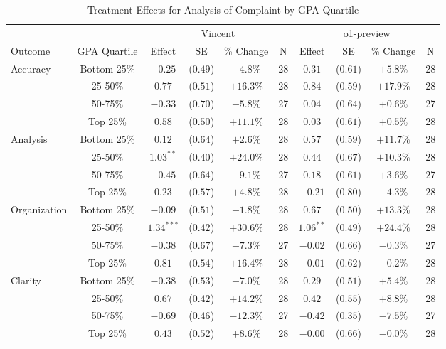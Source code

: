\begin{table}[!htbp]
\centering
\caption{Treatment Effects for Analysis of Complaint by GPA Quartile}
\label{tab:task3_gpa}
\begin{tabular}{lccccccccc}
\hline\hline
& & \multicolumn{4}{c}{Vincent} & \multicolumn{4}{c}{o1-preview} \\
\cline{3-10}
Outcome & GPA Quartile & Effect & SE & \% Change & N & Effect & SE & \% Change & N \\
\hline
\multirow{4}{*}{Accuracy} & Bottom 25\% & $-0.25$ & ($0.49$) & $-4.8\%$ & 28 & $0.31$ & ($0.61$) & $+5.8\%$ & 28 \\
& 25-50\% & $0.77$ & ($0.51$) & $+16.3\%$ & 28 & $0.84$ & ($0.59$) & $+17.9\%$ & 28 \\
& 50-75\% & $-0.33$ & ($0.70$) & $-5.8\%$ & 27 & $0.04$ & ($0.64$) & $+0.6\%$ & 27 \\
& Top 25\% & $0.58$ & ($0.50$) & $+11.1\%$ & 28 & $0.03$ & ($0.61$) & $+0.5\%$ & 28 \\
\hline
\multirow{4}{*}{Analysis} & Bottom 25\% & $0.12$ & ($0.64$) & $+2.6\%$ & 28 & $0.57$ & ($0.59$) & $+11.7\%$ & 28 \\
& 25-50\% & $1.03^{**}$ & ($0.40$) & $+24.0\%$ & 28 & $0.44$ & ($0.67$) & $+10.3\%$ & 28 \\
& 50-75\% & $-0.45$ & ($0.64$) & $-9.1\%$ & 27 & $0.18$ & ($0.61$) & $+3.6\%$ & 27 \\
& Top 25\% & $0.23$ & ($0.57$) & $+4.8\%$ & 28 & $-0.21$ & ($0.80$) & $-4.3\%$ & 28 \\
\hline
\multirow{4}{*}{Organization} & Bottom 25\% & $-0.09$ & ($0.51$) & $-1.8\%$ & 28 & $0.67$ & ($0.50$) & $+13.3\%$ & 28 \\
& 25-50\% & $1.34^{***}$ & ($0.42$) & $+30.6\%$ & 28 & $1.06^{**}$ & ($0.49$) & $+24.4\%$ & 28 \\
& 50-75\% & $-0.38$ & ($0.67$) & $-7.3\%$ & 27 & $-0.02$ & ($0.66$) & $-0.3\%$ & 27 \\
& Top 25\% & $0.81$ & ($0.54$) & $+16.4\%$ & 28 & $-0.01$ & ($0.62$) & $-0.2\%$ & 28 \\
\hline
\multirow{4}{*}{Clarity} & Bottom 25\% & $-0.38$ & ($0.53$) & $-7.0\%$ & 28 & $0.29$ & ($0.51$) & $+5.4\%$ & 28 \\
& 25-50\% & $0.67$ & ($0.42$) & $+14.2\%$ & 28 & $0.42$ & ($0.55$) & $+8.8\%$ & 28 \\
& 50-75\% & $-0.69$ & ($0.46$) & $-12.3\%$ & 27 & $-0.42$ & ($0.35$) & $-7.5\%$ & 27 \\
& Top 25\% & $0.43$ & ($0.52$) & $+8.6\%$ & 28 & $-0.00$ & ($0.66$) & $-0.0\%$ & 28 \\

\end{tabular}
\end{table}
